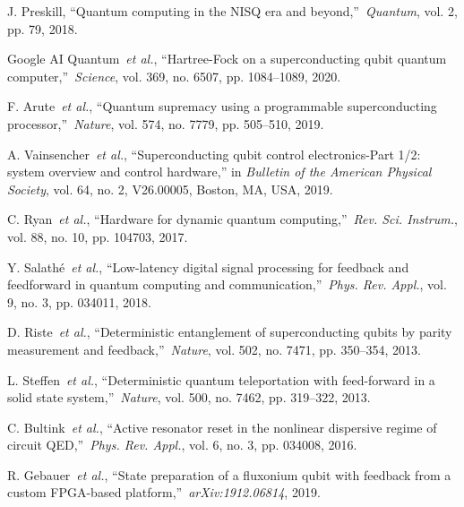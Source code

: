 \documentclass{ieeetran}
\begin{document}
\begin{thebibliography}{00}

 J. Preskill, ``Quantum computing in the NISQ era and beyond,''~\emph{Quantum}, vol. 2, pp. 79, 2018.

 Google AI Quantum~\emph{et al.}, ``Hartree-Fock on a superconducting qubit quantum computer,''~\emph{Science}, vol. 369, no. 6507, pp. 1084--1089, 2020.

 F. Arute~\emph{et al.}, ``Quantum supremacy using a programmable superconducting processor,''~\emph{Nature}, vol. 574, no. 7779, pp. 505--510, 2019.


 A. Vainsencher~\emph{et al.}, ``Superconducting qubit control electronics-Part 1/2: system overview and control hardware,'' in \emph{Bulletin of the American Physical Society}, vol. 64, no. 2, V26.00005, Boston, MA, USA, 2019.

 C. Ryan~\emph{et al.}, ``Hardware for dynamic quantum computing,''~\emph{Rev. Sci. Instrum.}, vol. 88, no. 10, pp. 104703, 2017.

 Y. Salath{\'e}~\emph{et al.}, ``Low-latency digital signal processing for feedback and feedforward in quantum computing and communication,''~\emph{Phys. Rev. Appl.}, vol. 9, no. 3, pp. 034011, 2018.

 D. Riste~\emph{et al.}, ``Deterministic entanglement of superconducting qubits by parity measurement and feedback,''~\emph{Nature}, vol. 502, no. 7471, pp. 350--354, 2013.

 L. Steffen~\emph{et al.}, ``Deterministic quantum teleportation with feed-forward in a solid state system,''~\emph{Nature}, vol. 500, no. 7462, pp. 319--322, 2013.

 C. Bultink~\emph{et al.}, ``Active resonator reset in the nonlinear dispersive regime of circuit QED,''~\emph{Phys. Rev. Appl.}, vol. 6, no. 3, pp. 034008, 2016.

 R. Gebauer~\emph{et al.}, ``State preparation of a fluxonium qubit with feedback from a custom FPGA-based platform,''~\emph{arXiv:1912.06814}, 2019.


\end{thebibliography}
\end{document}

